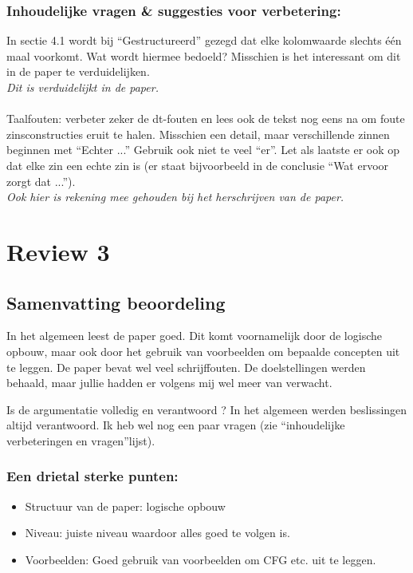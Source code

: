 \documentclass{article}
\begin{document}
\subsubsection*{Inhoudelijke vragen \& suggesties voor verbetering:}
In sectie 4.1 wordt bij “Gestructureerd” gezegd dat elke kolomwaarde slechts
één maal voorkomt. Wat wordt hiermee bedoeld? Misschien is het
interessant om dit in de paper te verduidelijken. \\ 
\textit{Dit is verduidelijkt in de paper.} \\ \\
Taalfouten: verbeter zeker de dt-fouten en lees ook de tekst nog eens na om foute zinsconstructies eruit te halen. Misschien een detail, maar verschillende zinnen beginnen met “Echter ...” Gebruik ook niet te veel “er”. Let als laatste er ook op dat elke zin een echte zin is (er staat bijvoorbeeld in de conclusie “Wat ervoor zorgt dat ...”). \\
\textit{Ook hier is rekening mee gehouden bij het herschrijven van de paper.}

\section{Review 3}

\subsection*{Samenvatting beoordeling}

In het algemeen leest de paper goed. Dit komt voornamelijk door de logische opbouw, maar ook door het gebruik van voorbeelden om bepaalde concepten uit te leggen. De paper bevat wel veel schrijffouten. De doelstellingen werden behaald, maar jullie hadden er volgens mij wel meer van verwacht.

\par Is de argumentatie volledig en verantwoord ? In het algemeen werden beslissingen altijd verantwoord. Ik heb wel nog een paar vragen (zie “inhoudelijke verbeteringen en vragen”lijst).

\subsubsection{Een drietal sterke punten:}
\begin{itemize}
\item Structuur van de paper: logische opbouw
\item Niveau: juiste niveau waardoor alles goed te volgen is.
\item Voorbeelden: Goed gebruik van voorbeelden om CFG etc. uit te leggen.
\end{itemize}
\end{document}
